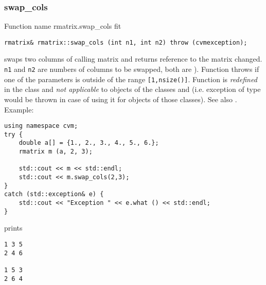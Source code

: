 \subsubsection{swap\_cols}
Function%
\pdfdest name {rmatrix.swap_cols} fit
\begin{verbatim}
rmatrix& rmatrix::swap_cols (int n1, int n2) throw (cvmexception);
\end{verbatim}
swaps two columns of  calling matrix and returns  reference to
the matrix changed. \verb"n1" and \verb"n2" are
 numbers of columns to be swapped,
both are \Based).
Function throws  
if one of the parameters is outside of the range
\verb"[1,nsize()]".
Function is \emph{redefined} in  the class
 and
\emph{not applicable} to objects of the classes
 and
 (i.e. exception of
type  would be thrown
in case of using it for objects of those classes).
See also .
Example:
\begin{Verbatim}
using namespace cvm;
try {
    double a[] = {1., 2., 3., 4., 5., 6.};
    rmatrix m (a, 2, 3);

    std::cout << m << std::endl;
    std::cout << m.swap_cols(2,3);
}
catch (std::exception& e) {
    std::cout << "Exception " << e.what () << std::endl;
}
\end{Verbatim}
prints
\begin{Verbatim}
1 3 5
2 4 6

1 5 3
2 6 4
\end{Verbatim}
\newpage





